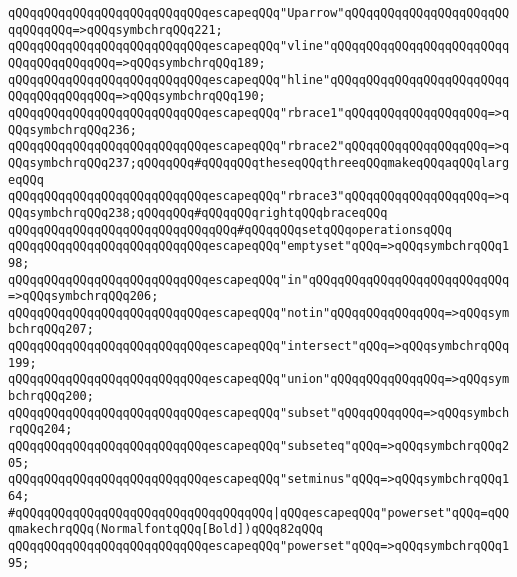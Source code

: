 \verb|qQQqqQQqqQQqqQQqqQQqqQQqqQQqescapeqQQq"Uparrow"qQQqqQQqqQQqqQQqqQQqqQQqqQQqqQQq=>qQQqsymbchrqQQq221;|\newline
\verb|qQQqqQQqqQQqqQQqqQQqqQQqqQQqescapeqQQq"vline"qQQqqQQqqQQqqQQqqQQqqQQqqQQqqQQqqQQqqQQq=>qQQqsymbchrqQQq189;|\newline
\verb|qQQqqQQqqQQqqQQqqQQqqQQqqQQqescapeqQQq"hline"qQQqqQQqqQQqqQQqqQQqqQQqqQQqqQQqqQQqqQQq=>qQQqsymbchrqQQq190;|\newline
\newline
\verb|qQQqqQQqqQQqqQQqqQQqqQQqqQQqescapeqQQq"rbrace1"qQQqqQQqqQQqqQQqqQQq=>qQQqsymbchrqQQq236;|\newline
\verb|qQQqqQQqqQQqqQQqqQQqqQQqqQQqescapeqQQq"rbrace2"qQQqqQQqqQQqqQQqqQQq=>qQQqsymbchrqQQq237;qQQqqQQq#qQQqqQQqtheseqQQqthreeqQQqmakeqQQqaqQQqlargeqQQq|\newline
\verb|qQQqqQQqqQQqqQQqqQQqqQQqqQQqescapeqQQq"rbrace3"qQQqqQQqqQQqqQQqqQQq=>qQQqsymbchrqQQq238;qQQqqQQq#qQQqqQQqrightqQQqbraceqQQq|\newline
\newline
\verb|qQQqqQQqqQQqqQQqqQQqqQQqqQQqqQQq#qQQqqQQqsetqQQqoperationsqQQq|\newline
\verb|qQQqqQQqqQQqqQQqqQQqqQQqqQQqescapeqQQq"emptyset"qQQq=>qQQqsymbchrqQQq198;|\newline
\verb|qQQqqQQqqQQqqQQqqQQqqQQqqQQqescapeqQQq"in"qQQqqQQqqQQqqQQqqQQqqQQqqQQq=>qQQqsymbchrqQQq206;|\newline
\verb|qQQqqQQqqQQqqQQqqQQqqQQqqQQqescapeqQQq"notin"qQQqqQQqqQQqqQQq=>qQQqsymbchrqQQq207;|\newline
\verb|qQQqqQQqqQQqqQQqqQQqqQQqqQQqescapeqQQq"intersect"qQQq=>qQQqsymbchrqQQq199;|\newline
\verb|qQQqqQQqqQQqqQQqqQQqqQQqqQQqescapeqQQq"union"qQQqqQQqqQQqqQQq=>qQQqsymbchrqQQq200;|\newline
\verb|qQQqqQQqqQQqqQQqqQQqqQQqqQQqescapeqQQq"subset"qQQqqQQqqQQq=>qQQqsymbchrqQQq204;|\newline
\verb|qQQqqQQqqQQqqQQqqQQqqQQqqQQqescapeqQQq"subseteq"qQQq=>qQQqsymbchrqQQq205;|\newline
\verb|qQQqqQQqqQQqqQQqqQQqqQQqqQQqescapeqQQq"setminus"qQQq=>qQQqsymbchrqQQq164;|\newline
\verb|#qQQqqQQqqQQqqQQqqQQqqQQqqQQqqQQqqQQq|\verb#|qQQqescapeqQQq"powerset"qQQq=qQQqmakechrqQQq(NormalfontqQQq[Bold])qQQq82qQQq#\newline
\verb|qQQqqQQqqQQqqQQqqQQqqQQqqQQqescapeqQQq"powerset"qQQq=>qQQqsymbchrqQQq195;|\newline
